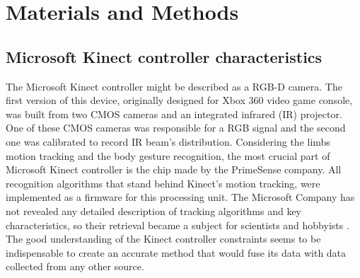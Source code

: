 \documentclass[sensors,article,submit,moreauthors,pdftex,10pt,a4paper]{mdpi}
\begin{document}
\section{Materials and Methods}



\subsection{Microsoft Kinect controller characteristics}
The Microsoft Kinect controller might be described as a RGB-D camera. The first version of this device, originally designed for Xbox 360 video game console, was built from two CMOS cameras and an integrated infrared (IR) projector. One of these CMOS cameras was responsible for a RGB signal and the second one was calibrated to record IR beam’s distribution. Considering the limbs motion tracking and the body gesture recognition, the most crucial part of Microsoft Kinect controller is the chip made by the PrimeSense company. All recognition algorithms that stand behind Kinect’s motion tracking, were implemented as a firmware for this processing unit. 
The Microsoft Company has not revealed any detailed description of tracking algorithms and key characteristics, so their retrieval became a subject for scientists and hobbyists \cite{Skalski2015,Gonzalez-Jorge2013,Khoshelham2012}. The good understanding of the Kinect controller constraints seems to be indispensable to create an accurate method that would fuse its data with data collected from any other source. 
\end{document}
